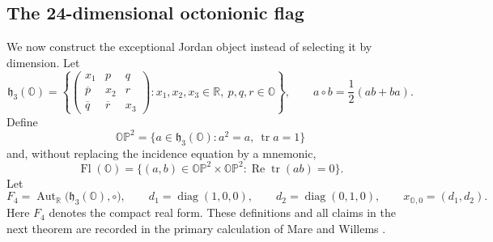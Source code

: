 \subsection{The 24-dimensional octonionic flag}
\label{h24:sec:octonionic-flag}

We now construct the exceptional Jordan object instead of selecting it by
dimension.  Let
\[
 \mathfrak h_3(\mathbb O)=
 \left\{
 \begin{pmatrix}
 x_1&p&q\\ \overline p&x_2&r\\ \overline q&\overline r&x_3
 \end{pmatrix}:
 x_1,x_2,x_3\in\mathbb R,\ p,q,r\in\mathbb O
 \right\},
 \qquad
 a\circ b=\frac12(ab+ba).
\]
Define
\[
 \mathbb O\mathbb P^2=\{a\in\mathfrak h_3(\mathbb O):a^2=a,\ \operatorname{tr} a=1\}
\]
and, without replacing the incidence equation by a mnemonic,
\begin{equation}
 \operatorname{Fl}(\mathbb O)=
 \{(a,b)\in\mathbb O\mathbb P^2\times\mathbb O\mathbb P^2:
                 \operatorname{Re}\operatorname{tr}(ab)=0\}.
 \label{h24:eq:octonionic-flag-definition}
\end{equation}
Let
\[
 F_4=\operatorname{Aut}_{\mathbb R}\bigl(\mathfrak h_3(\mathbb O),\circ\bigr),\qquad
 d_1=\operatorname{diag}(1,0,0),\qquad d_2=\operatorname{diag}(0,1,0),\qquad
 x_{\mathbb O,0}=(d_1,d_2).
\]
Here \(F_4\) denotes the compact real form.  These definitions and all
claims in the next theorem are recorded in the primary calculation of
 Mare and Willems \cite[Definition~2.2, p.~488;
 Proposition~2.4, p.~489, and Proposition~2.7, p.~491, and the
 root-space discussion on pp.~491--492]{h24:MareWillems2013}.

